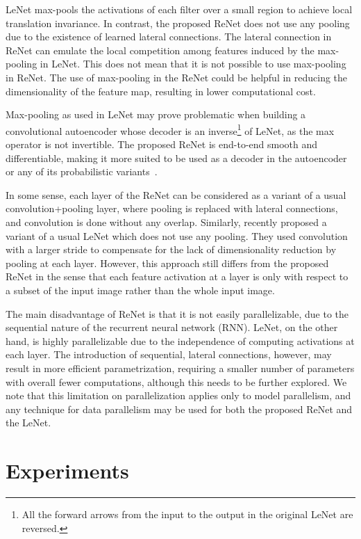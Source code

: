 LeNet max-pools the activations of each filter over a small region to achieve
local translation invariance. In contrast, the proposed ReNet does not use any
pooling due to the existence of learned lateral connections. The lateral
connection in ReNet can emulate the local competition among features induced by
the max-pooling in LeNet.  This does not mean that it is not possible to use
max-pooling in ReNet. The use of max-pooling in the ReNet could be helpful in
reducing the dimensionality of the feature map, resulting in lower computational
cost.

Max-pooling as used in LeNet may prove problematic when building a
convolutional autoencoder whose decoder is an inverse\footnote{
    All the forward arrows from the input to the output in the original LeNet
    are reversed.
}
of LeNet, as the max operator is not invertible. The proposed
ReNet is end-to-end smooth and differentiable, making it more suited to be used
as a decoder in the autoencoder or any of its probabilistic variants~\citep[see,
e.g.,][]{Kingma+Welling-ICLR2014}.

In some sense, each layer of the ReNet can be considered as a variant of a usual
convolution+pooling layer, where pooling is replaced with lateral connections,
and convolution is done without any overlap. Similarly, \citet{Springenberg2014}
recently proposed a variant of a usual LeNet which does not use any pooling.
They used convolution with a larger stride to compensate for the lack of
dimensionality reduction by pooling at each layer. However, this approach still
differs from the proposed ReNet in the sense that each feature activation at a
layer is only with respect to a subset of the input image rather than the whole
input image.

The main disadvantage of ReNet is that it is not easily parallelizable, due to
the sequential nature of the recurrent neural network (RNN). LeNet, on the other
hand, is highly parallelizable due to the independence of computing activations
at each layer. The introduction of sequential, lateral connections, however, may
result in more efficient parametrization, requiring a smaller number of
parameters with overall fewer computations, although this needs to be further
explored. We note that this limitation on parallelization applies only to
model parallelism, and any technique for data parallelism may be used for both
the proposed ReNet and the LeNet.

\section{Experiments}

